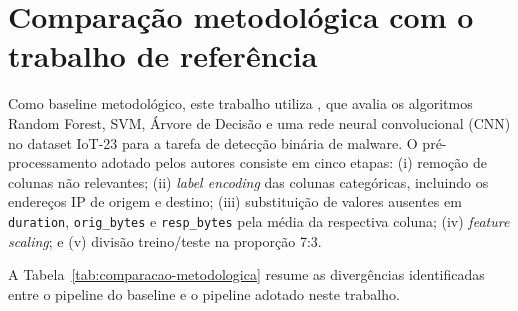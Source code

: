 %

\section{Comparação metodológica com o trabalho de referência}
\label{sec:comparacao-metodologica}

Como baseline metodológico, este trabalho utiliza \citep{souza2024avaliacao}, que avalia os algoritmos Random Forest, SVM, Árvore de Decisão e uma rede neural convolucional (CNN) no dataset IoT-23 para a tarefa de detecção binária de malware. O pré-processamento adotado pelos autores consiste em cinco etapas: (i) remoção de colunas não relevantes; (ii) \textit{label encoding} das colunas categóricas, incluindo os endereços IP de origem e destino; (iii) substituição de valores ausentes em \texttt{duration}, \texttt{orig\_bytes} e \texttt{resp\_bytes} pela média da respectiva coluna; (iv) \textit{feature scaling}; e (v) divisão treino/teste na proporção 7:3.

A Tabela~\ref{tab:comparacao-metodologica} resume as divergências identificadas entre o pipeline do baseline e o pipeline adotado neste trabalho.

